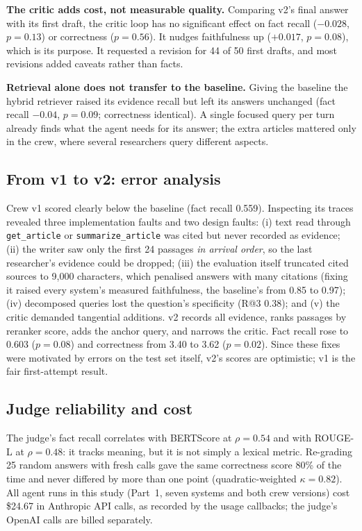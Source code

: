 \textbf{The critic adds cost, not measurable quality.} Comparing v2's final answer with its first draft, the critic
loop has no significant effect on fact recall ($-0.028$, $p=0.13$) or correctness ($p=0.56$). It nudges
faithfulness up ($+0.017$, $p=0.08$), which is its purpose. It requested a revision for 44 of 50 first drafts, and
most revisions added caveats rather than facts.

\textbf{Retrieval alone does not transfer to the baseline.} Giving the baseline the hybrid retriever raised its
evidence recall but left its answers unchanged (fact recall $-0.04$, $p=0.09$; correctness identical). A single
focused query per turn already finds what the agent needs for its answer; the extra articles mattered only in the
crew, where several researchers query different aspects.

\subsection{From v1 to v2: error analysis}
\label{sec:v2}
Crew v1 scored clearly below the baseline (fact recall 0.559). Inspecting its traces revealed three
implementation faults and two design faults:
(i) text read through \texttt{get\_article} or \texttt{summarize\_article} was cited but never recorded as
evidence;
(ii) the writer saw only the first 24 passages \emph{in arrival order}, so the last researcher's evidence could be
dropped;
(iii) the evaluation itself truncated cited sources to 9{,}000 characters, which penalised answers with many
citations (fixing it raised every system's measured faithfulness, the baseline's from 0.85 to 0.97);
(iv) decomposed queries lost the question's specificity (R@3 0.38); and (v) the critic demanded tangential
additions. v2 records all evidence, ranks passages by reranker score, adds the anchor query, and narrows the
critic. Fact recall rose to 0.603 ($p=0.08$) and correctness from 3.40 to 3.62 ($p=0.02$). Since these fixes were
motivated by errors on the test set itself, v2's scores are optimistic; v1 is the fair first-attempt result.

\subsection{Judge reliability and cost}
The judge's fact recall correlates with BERTScore at $\rho=0.54$ and with ROUGE-L at $\rho=0.48$: it tracks meaning,
but it is not simply a lexical metric. Re-grading 25 random answers with fresh calls gave the same correctness score
80\% of the time and never differed by more than one point (quadratic-weighted $\kappa=0.82$). All agent runs in this study
(Part~1, seven systems and both crew versions) cost \$24.67 in Anthropic API calls, as recorded by the usage
callbacks; the judge's OpenAI calls are billed separately.

